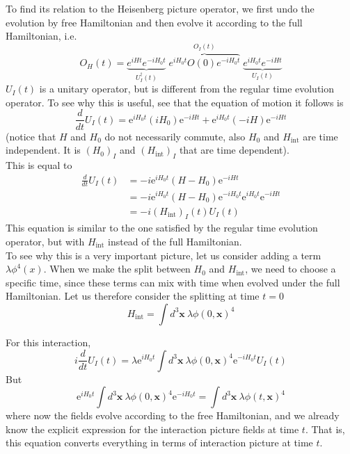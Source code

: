 \documentclass[11pt, notitlepage]{report}
\newcommand{\e}{\mathrm{e}}
\numberwithin{equation}{section}
\begin{document}
    To find its relation to the Heisenberg picture operator, we first undo the evolution by free Hamiltonian and then evolve it according to the full Hamiltonian, i.e.
    \begin{equation*}
        O_H(t) =
        \underbrace{e^{i H t} e^{-i H_0 t} }_{U_I^\dagger(t)}
        \;
        \overbrace{e^{i H_0 t}O(0)e^{-i H_0 t}}^{O_I(t)}
        \;
        \underbrace{ e^{i H_0 t} e^{-i H t}}_{U_I(t)}
    \end{equation*}
    \(U_I(t)\) is a unitary operator, but is different from the regular time evolution operator. To see why this is useful, see that the equation of motion it follows is
    \begin{equation*}
        \frac{d}{dt}U_I(t) = \e^{iH_0t}(iH_0)\e^{-iHt} + \e^{iH_0t} (-iH) \e^{-iHt}
    \end{equation*}
    (notice that \(H\) and \(H_0\) do not necessarily commute, also \(H_0\) and \(H_{\text{int}}\) are time independent. It is \((H_0)_I\) and \((H_{\text{int}})_I\) that are time dependent).\\
    This is equal to 
    \begin{align*}
        \frac{d}{dt}U_I(t)&= -i\e^{iH_0t} (H- H_0) \e^{-iHt}\\
        &=-i\e^{iH_0t} (H- H_0) \e^{-iH_0t} \e^{iH_0t}\e^{-iHt}\\
        &=-i(H_{\text{int}})_I(t) U_I(t)
    \end{align*}
    This equation is similar to the one satisfied by the regular time evolution operator, but with \(H_{\text{int}}\) instead of the full Hamiltonian. \\

    To see why this is a very important picture, let us consider adding a term \(\lambda\phi^4(x)\). When we make the split between \(H_0\) and \(H_{\text{int}}\), we need to choose a specific time, since these terms can mix with time when evolved under the full Hamiltonian. Let us therefore consider the splitting at time \(t=0\)
    \begin{equation*}
        H_{\text{int}} = \int d^3\textbf{x} ~\lambda \phi(0, \textbf{x})^4
    \end{equation*}

    For this interaction, 
    \begin{equation*}
        i\frac{d}{dt}U_I(t) = \lambda \e^{iH_0t}  \int d^3\textbf{x} ~\lambda \phi(0, \textbf{x})^4 \e^{-iH_0t} U_I(t)
    \end{equation*}
    But 
    \begin{equation*}
        \e^{iH_0t}  \int d^3\textbf{x} ~\lambda \phi(0, \textbf{x})^4 \e^{-iH_0t} = \int d^3\textbf{x}~\lambda \phi(t, \textbf{x})^4
    \end{equation*}
    where now the fields evolve according to the free Hamiltonian, and we already know the explicit expression for the interaction picture fields at time \(t\). That is, this equation converts everything in terms of interaction picture at time \(t\).\\
\end{document}
